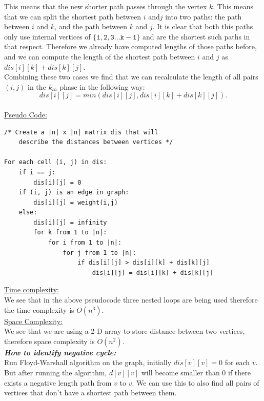 \documentclass[12pt]{book}
\begin{document}
This means that the new shorter path passes through the vertex $k$. This means that we can split the shortest path between $i$ and$j$ into two paths: the path between $i$ and $k$, and the path between $k$ and $j$. It is clear that both this paths only use internal vertices of $\mathtt{\{1, 2, 3 ... k-1\}}$ and are the shortest such paths in that respect. Therefore we already have computed lengths of those paths before, and we can compute the length of the shortest path between $i$ and $j$ as $dis[i][k] + dis[k][j]$.\\

Combining these two cases we find that we can recalculate the length of all pairs $(i,j)$ in the $k_{th}$ phase in the following way:\\
\textbf{\[dis[i][j] = min(dis[i][j], dis[i][k] + dis[k][j]).\]}\\

\underline{Pseudo Code:}\\

\begin{lstlisting}
/* Create a |n| x |n| matrix dis that will
    describe the distances between vertices */

For each cell (i, j) in dis:
    if i == j:
        dis[i][j] = 0
    if (i, j) is an edge in graph:
        dis[i][j] = weight(i,j)
    else:
        dis[i][j] = infinity
        for k from 1 to |n|:
            for i from 1 to |n|:
                for j from 1 to |n|:
                    if dis[i][j] > dis[i][k] + dis[k][j]
                        dis[i][j] = dis[i][k] + dis[k][j]
\end{lstlisting}

\underline{Time complexity:} \\
We see that in the above pseudocode three nested loops are being used therefore the time complexity is $O(n^3)$.\\

\underline{Space Complexity:}\\
We see that we are using a 2-D array to store distance between two vertices, therefore space complexity is $O(n^2)$.\\

\textbf{\textit{How to identify negative cycle:}}\\
Run Floyd-Warshall algorithm on the graph, initially $dis[v][v] = 0$ for each $v$. But after running the algorithm, $d[v][v]$ will become smaller than 0 if there exists a negative length path from $v$ to $v$. We can use this to also find all pairs of vertices that don’t have a shortest path between them.\\
\end{document}
